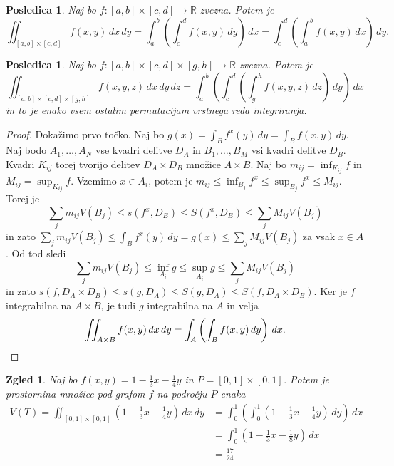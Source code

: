 \documentclass[10pt, a4paper]{article}
\newtheorem{posledica}[izr]{Posledica}
\newtheorem{zgled}{Zgled}[section]
\newenvironment{noticeC}{%
  \tcolorbox[%
  notitle,
  empty,
  enhanced,  %
  breakable,
  coltext=black, 
  fontupper=\rmfamily,
  parbox=false,
  noparskip,
  sharp corners,
  boxrule=-1pt,  %
  frame hidden,
  left=7pt,  %
  right=7pt,
  top=5pt,
  bottom=5pt,
  before skip=2.5ex plus 2pt,
  after skip=2.5ex plus 2pt,
  overlay unbroken and last={%
  },
  ]}
{\endtcolorbox}
\newenvironment{dokaz}%
  {\begin{noticeC}\begin{proof}}%
  {\end{proof}\end{noticeC}}
\newcommand{\R}{\mathbb {R}}
\begin{document}
\begin{posledica}
    Naj bo $f: [a, b] \times [c, d] \to \R$ zvezna. Potem je 
    $$\iint_{[a, b] \times [c, d]} f(x, y)\, dx\, dy = \int_a ^b \left(\int_c ^d f(x, y)\, dy\right)\, dx = \int_c ^d \left(\int_a ^b f(x, y)\, dx\right)\, dy.$$
\end{posledica}

\begin{posledica}
    Naj bo $f: [a, b] \times [c, d] \times [g, h] \to \R$ zvezna. Potem je 
    $$\iint_{[a, b] \times [c, d] \times [g, h]} f(x, y, z)\, dx\, dy\, dz = \int_a ^b \left(\int_c ^d \left(\int_g ^h f(x, y, z)\, dz\right)\, dy\right)\, dx$$
    in to je enako vsem ostalim permutacijam vrstnega reda integriranja.
\end{posledica}

\begin{dokaz}
    Dokažimo prvo točko. Naj bo $g(x) = \int_B f^x (y)\, dy = \int_B f(x, y)\, dy$.
    Naj bodo $A_1, \dots, A_N$ vse kvadri delitve $D_A$ in $B_1, \dots, B_M$ vsi kvadri 
    delitve $D_B$. Kvadri $K_{ij}$ torej tvorijo delitev $D_A \times D_B$ množice $A \times B$.
    Naj bo $m_{ij} = \inf_{K_{ij}} f$ in $M_{ij} = \sup_{K_{ij}} f$. Vzemimo $x \in A_i$, potem je 
    $m_{ij} \leq \inf_{B_j} f^x \leq \sup_{B_j} f^x \leq M_{ij}$.
    Torej je 
    $$\sum_j m_{ij} V(B_j) \leq s(f^x, D_B) \leq S(f^x, D_B) \leq \sum_j M_{ij} V(B_j)$$
    in zato $\sum_j m_{ij} V(B_j) \leq \int_B f^x (y)\, dy = g(x) \leq \sum_j M_{ij} V(B_j)$ za vsak $x \in A$.
    Od tod sledi $$\sum_j m_{ij} V(B_j) \leq \inf_{A_{i}} g \leq \sup_{A_{i}} g \leq \sum_j M_{ij} V(B_j)$$
    in zato $s(f, D_A \times D_B) \leq s (g, D_A) \leq S(g, D_A) \leq S(f, D_A \times D_B)$.
    Ker je $f$ integrabilna na $A \times B$, je tudi $g$ integrabilna na $A$ in velja 
    \begin{equation*}
        \iint_{A \times B} f(x, y)\, dx\, dy = \int_A \left(\int_B f(x, y)\, dy\right)\, dx. \qedhere
    \end{equation*} 
\end{dokaz}

\begin{zgled}\label{zgl:3}
    Naj bo $f(x, y) = 1 - \frac{1}{3}x - \frac{1}{4}y$ in $P = [0, 1] \times [0, 1]$.
    Potem je prostornina množice pod grafom $f$ na področju $P$ enaka 
    \begin{align*}
        V(T) = \iint_{[0, 1] \times [0, 1]}\left(1 - \frac{1}{3}x - \frac{1}{4}y\right)\, dx\, dy &= \int_0 ^1 \left(\int_0 ^1 \left(1 - \frac{1}{3}x - \frac{1}{4}y\right)\, dy\right)\, dx\\
        &= \int_0 ^1 \left(1 - \frac{1}{3}x - \frac{1}{8}y\right)\, dx\\
        &=\frac{17}{24}
    \end{align*}
\end{zgled}
\end{document}
